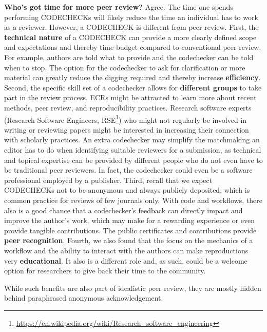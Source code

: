 \documentclass[12pt]{article}
\begin{document}
\textbf{Who's got time for more peer review?} Agree.
The time one spends performing CODECHECKs will likely reduce the time an individual has to work as a reviewer.
However, a CODECHECK is different from peer review.
First, the \textbf{technical nature} of a CODECHECK can provide a more 
clearly defined scope and expectations and thereby time budget compared to conventional 
peer review. 
For example, authors are told what to provide and the codechecker can be told when to stop.
The option for the codechecker to ask for clarification or more 
material can greatly reduce the digging required and thereby
increase \textbf{efficiency}.
Second, the specific skill set of a codechecker allows for \textbf{different groups} to take part in the review process.
ECRs might be attracted to learn more about recent methods, peer review, and reproducibility practices.
Research software experts (Research Software Engineers, RSE\footnote{\url{https://en.wikipedia.org/wiki/Research_software_engineering}}) who might
not regularly be involved in writing or reviewing papers might be interested in increasing their connection with scholarly practices.
An extra codechecker may simplify the matchmaking an editor has to do
when identifying suitable reviewers for a submission, as technical and
topical expertise can be provided by different people who do not even have to be traditional peer reviewers.
In fact, the codechecker could even be a software professional employed by a publisher.
Third, recall that we expect CODECHECKs not to be anonymous and always
publicly deposited, which is common practice for reviews of few journals only.
With code and workflows, there also is a good chance that a codechecker's
feedback can directly impact and improve the author's 
work, which may make for a rewarding experience or even provide tangible contributions.
The public certificates and contributions provide \textbf{peer recognition}.
Fourth, we also found that the focus on the mechanics of a
workflow and the ability to interact with the authors can make
reproductions very \textbf{educational}. It also is a different role and, as such, could
be a welcome option for researchers to give back their time to the community.

While such benefits are also part of idealistic peer review, they are mostly hidden behind paraphrased anonymous acknowledgement.
\end{document}
